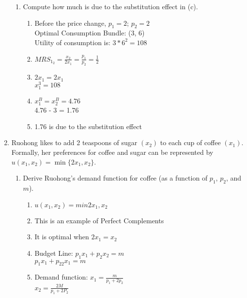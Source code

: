 \documentclass[11pt]{article}
\begin{document}
\begin{enumerate}
\begin{enumerate}
        \item Compute how much is due to the substitution effect in (c).
        \begin{enumerate}
            \item Before the price change, $p_1 = 2$; $p_2 = 2$\\
            Optimal Consumption Bundle: (3, 6)\\
            Utility of consumption is: $3*6^2 = 108$
            \item $MRS_1_2 = \frac{x_2}{2x_1} = \frac{p_1}{p_2} = \frac{1}{2}$
            \item $2x_1 = 2x_1$\\
            $x_1^3 = 108$
            \item $x_1^B = x_2^B = 4.76$\\
            4.76 - 3 = 1.76
            \item 1.76 is due to the substitution effect
        \end{enumerate}

    \end{enumerate}


\item Ruohong likes to add 2 teaspoons of sugar $(x_{2})$ to each cup of coffee $(x_{1})$. Formally, her preferences for coffee and sugar can be represented by $u(x_{1},x_{2})=\min\{2x_{1},x_{2}\}$.

    \begin{enumerate}
        \item Derive Ruohong's demand function for coffee (as a function of $p_{1}$, $p_{2}$, and $m$).
        \begin{enumerate}
            \item $u(x_1, x_2) = min{2x_1, x_2}$
            \item This is an example of Perfect Complements
            \item It is optimal when $2x_1 = x_2$
            \item Budget Line: $p_1x_1 + p_2x_2 = m$\\
            $p_1x_1 + p_22x_1 = m$
            \item Demand function: $x_1 = \frac{m}{p_1+2p_2}$\\
            $x_2 = \frac{2M}{p_1+2P_2}$
        \end{enumerate}


\end{enumerate}
\end{enumerate}
\end{document}
